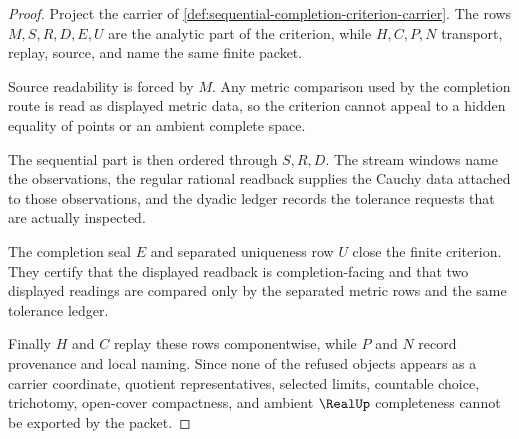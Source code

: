 \begin{proof}
Project the carrier of \autoref{def:sequential-completion-criterion-carrier}. The rows $M,S,R,D,E,U$ are the analytic part of the criterion, while $H,C,P,N$ transport, replay, source, and name the same finite packet.

Source readability is forced by $M$. Any metric comparison used by the completion route is read as displayed metric data, so the criterion cannot appeal to a hidden equality of points or an ambient complete space.

The sequential part is then ordered through $S,R,D$. The stream windows name the observations, the regular rational readback supplies the Cauchy data attached to those observations, and the dyadic ledger records the tolerance requests that are actually inspected.

The completion seal $E$ and separated uniqueness row $U$ close the finite criterion. They certify that the displayed readback is completion-facing and that two displayed readings are compared only by the separated metric rows and the same tolerance ledger.

Finally $H$ and $C$ replay these rows componentwise, while $P$ and $N$ record provenance and local naming. Since none of the refused objects appears as a carrier coordinate, quotient representatives, selected limits, countable choice, trichotomy, open-cover compactness, and ambient $\RealUp$ completeness cannot be exported by the packet.
\end{proof}




